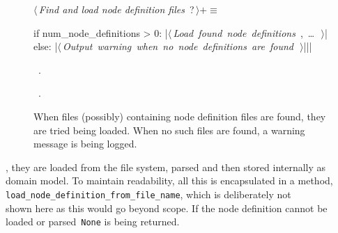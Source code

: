 \documentclass[%
    a4paper,    %
    justified,  %
    nobib,      %
    openany     %
]{tufte-book}
\begin{document}
\begin{figure}[!h]
  \begin{flushleft} \small
\begin{minipage}{\linewidth}\label{scrap6}\raggedright\small
{} $\langle\,${\itshape Find and load node definition files}\nobreak\ {\footnotesize {?}}$\,\rangle+\equiv$
\vspace{-1ex}
\begin{pythoncode}
if num_node_definitions > 0:
    |\hbox{$\langle\,${\itshape Load found node definitions}\nobreak\ {\footnotesize {}, \ldots\ }$\,\rangle$}|
else:
    |\hbox{$\langle\,${\itshape Output warning when no node definitions are found}\nobreak\ {\footnotesize {}}$\,\rangle$}||\NWsep|
\end{pythoncode}
\vspace{1.5ex}
\footnotesize
\begin{list}{}{\setlength{\itemsep}{-\parsep}\setlength{\itemindent}{-\leftmargin}}
\item \NWtxtMacroDefBy\ .
\item \NWtxtMacroRefIn\ .

\item{}
\end{list}
\end{minipage}\vspace{4ex}
\end{flushleft}
\caption{When files (possibly) containing node definition files are found,
    they are tried being loaded. When no such files are found, a warning message
    is being logged.}
  \label{lst:nodes-controller-find-node-def-files-2}
\end{figure}

, they are loaded from the
file system, parsed and then stored internally as domain model. To maintain
readability, all this is encapsulated in a
method,\\
\texttt{load_node_definition_from_file_name}, which is
deliberately not\\
shown here as this would go beyond scope. If the node
definition cannot be loaded or parsed~\texttt{None} is being
returned.
\end{document}
